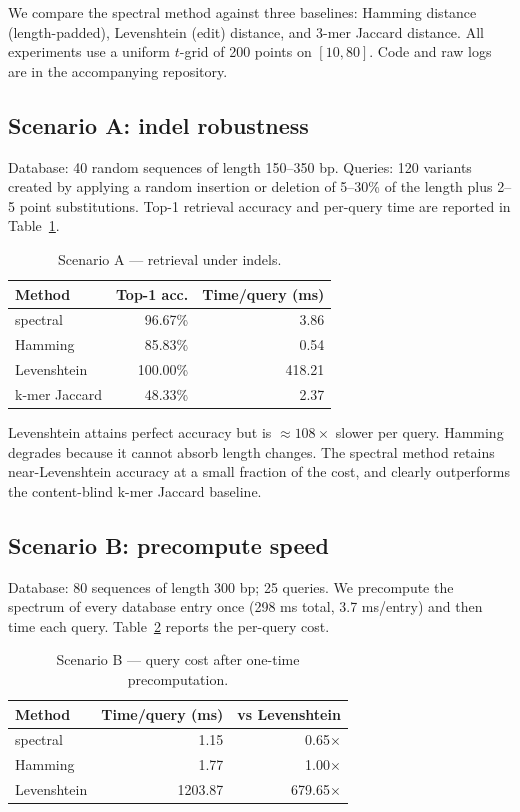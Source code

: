 \documentclass[12pt,a4paper]{article}
\begin{document}
We compare the spectral method against three baselines: Hamming distance
(length-padded), Levenshtein (edit) distance, and 3-mer Jaccard
distance. All experiments use a uniform $t$-grid of 200 points on
$[10, 80]$. Code and raw logs are in the accompanying repository.

\subsection{Scenario A: indel robustness}
\label{sec:bench-a}

Database: 40 random sequences of length 150--350 bp. Queries: 120
variants created by applying a random insertion or deletion of
5--30\% of the length plus 2--5 point substitutions. Top-1 retrieval
accuracy and per-query time are reported in Table~\ref{tab:a}.

\begin{table}[h]
\centering
\caption{Scenario A --- retrieval under indels.}
\label{tab:a}
\begin{tabular}{lrr}
\toprule
Method & Top-1 acc. & Time/query (ms) \\
\midrule
spectral       & 96.67\% & 3.86 \\
Hamming        & 85.83\% & 0.54 \\
Levenshtein    & 100.00\% & 418.21 \\
k-mer Jaccard  & 48.33\% & 2.37 \\
\bottomrule
\end{tabular}
\end{table}

Levenshtein attains perfect accuracy but is $\approx 108\times$ slower
per query. Hamming degrades because it cannot absorb length changes. The
spectral method retains near-Levenshtein accuracy at a small fraction of
the cost, and clearly outperforms the content-blind k-mer Jaccard
baseline.

\subsection{Scenario B: precompute speed}
\label{sec:bench-b}

Database: 80 sequences of length 300 bp; 25 queries. We precompute the
spectrum of every database entry once (298 ms total, 3.7 ms/entry) and
then time each query. Table~\ref{tab:b} reports the per-query cost.

\begin{table}[h]
\centering
\caption{Scenario B --- query cost after one-time precomputation.}
\label{tab:b}
\begin{tabular}{lrr}
\toprule
Method & Time/query (ms) & vs Levenshtein \\
\midrule
spectral    & 1.15 & 0.65$\times$ \\
Hamming     & 1.77 & 1.00$\times$ \\
Levenshtein & 1203.87 & 679.65$\times$ \\
\bottomrule
\end{tabular}
\end{table}
\end{document}
